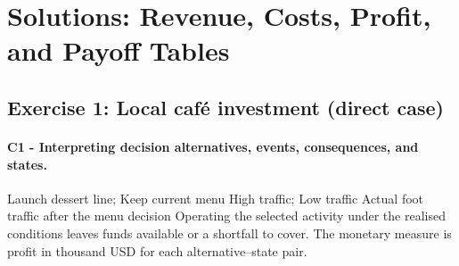 	\newpage
	\newpage
	\section{Solutions: Revenue, Costs, Profit, and Payoff Tables}
	\label{sec:solutions-extraction}
\label{toc}


	\subsection{Exercise 1: Local caf\'e investment (direct case)}
	\label{sec:problem1-local-cafe-c1-c3}
	\paragraph*{C1 - Interpreting decision alternatives, events, consequences, and states.}
	\DecisionElementsTable
{Launch dessert line; Keep current menu}
{High traffic; Low traffic}
{Actual foot traffic after the menu decision}
{Operating the selected activity under the realised conditions leaves funds available or a shortfall to cover. The monetary measure is profit in thousand USD for each alternative--state pair.}



